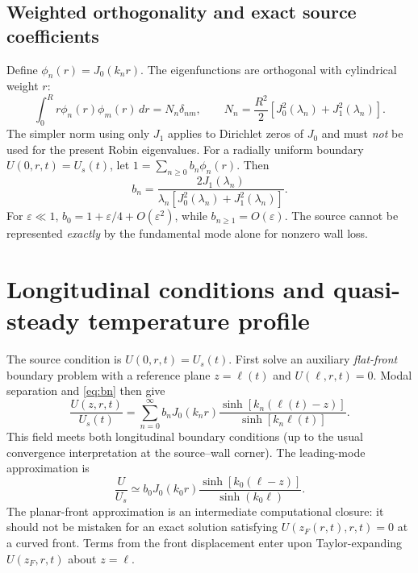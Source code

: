 \documentclass[11pt]{article}
\numberwithin{equation}{section}
\begin{document}
\subsection{Weighted orthogonality and exact source coefficients}
Define $\phi_n(r)=J_0(k_nr)$. The eigenfunctions are orthogonal with cylindrical weight $r$:
\begin{equation}\int_0^R r\phi_n(r)\phi_m(r)\,dr=N_n\delta_{nm},\qquad N_n=\frac{R^2}{2}\left[J_0^2(\lambda_n)+J_1^2(\lambda_n)\right].\label{eq:norm}\end{equation}
The simpler norm using only $J_1$ applies to Dirichlet zeros of $J_0$ and must \emph{not} be used for the present Robin eigenvalues. For a radially uniform boundary $U(0,r,t)=U_s(t)$, let $1=\sum_{n\ge0}b_n\phi_n(r)$. Then
\begin{equation}\boxed{b_n=\frac{2J_1(\lambda_n)}{\lambda_n[J_0^2(\lambda_n)+J_1^2(\lambda_n)]}.}\label{eq:bn}\end{equation}
For $\varepsilon\ll1$, $b_0=1+\varepsilon/4+O(\varepsilon^2)$, while $b_{n\ge1}=O(\varepsilon)$. The source cannot be represented \emph{exactly} by the fundamental mode alone for nonzero wall loss.

\section{Longitudinal conditions and quasi-steady temperature profile}
The source condition is $U(0,r,t)=U_s(t)$. First solve an auxiliary \emph{flat-front} boundary problem with a reference plane $z=\ell(t)$ and $U(\ell,r,t)=0$. Modal separation and \eqref{eq:bn} then give
\begin{equation}\boxed{\frac{U(z,r,t)}{U_s(t)}=\sum_{n=0}^\infty b_nJ_0(k_nr)\frac{\sinh[k_n(\ell(t)-z)]}{\sinh[k_n\ell(t)]}.}\label{eq:field}\end{equation}
This field meets both longitudinal boundary conditions (up to the usual convergence interpretation at the source--wall corner). The leading-mode approximation is
\begin{equation}\frac{U}{U_s}\simeq b_0J_0(k_0r)\frac{\sinh[k_0(\ell-z)]}{\sinh(k_0\ell)}.\label{eq:single}\end{equation}
The planar-front approximation is an intermediate computational closure: it should not be mistaken for an exact solution satisfying $U(z_F(r,t),r,t)=0$ at a curved front. Terms from the front displacement enter upon Taylor-expanding $U(z_F,r,t)$ about $z=\ell$.
\end{document}
